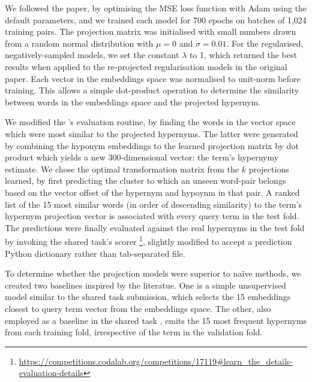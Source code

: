 We followed the paper, by optimising the MSE loss function with Adam \citep{kingma2014adam} using the default parameters, and we trained each model for 700 epochs on batches of 1,024 training pairs. The projection matrix was initialised with small numbers drawn from a random normal distribution with $\mu=0$ and $\sigma=0.01$.  For the regularised, negatively-sampled models, we set the constant $\lambda$ to 1, which returned the best results when applied to the re-projected regularisation models in the original paper.  Each vector in the embeddings space was normalised to unit-norm before training.  This allows a simple dot-product operation to determine the similarity between words in the embeddings space and the projected hypernym.

We modified the \citeauthor{ustalov2017negative}'s evaluation routine, by finding the words in the vector space which were most similar to the projected hypernyms.  The latter were generated by combining the hyponym embeddings to the learned projection matrix by dot product which yields a new 300-dimensional vector: the term's hypernymy estimate.  We chose the optimal transformation matrix from the $k$ projections learned, by first predicting the cluster to which an unseen word-pair belongs based on the vector offset of the hypernym and hypoynm in that pair.  A ranked list of the 15 most similar words (in order of descending similarity) to the term's hypernym projection vector is associated with every query term in the test fold.  The predictions were finally evaluated against the real hypernyms in the test fold by invoking the shared task's scorer \footnote{\url{https://competitions.codalab.org/competitions/17119\#learn_the_details-evaluation-details}}, slightly modified to accept a prediction Python dictionary rather than tab-separated file.  

To determine whether the projection models were superior to na\"ive methods, we created two baselines inspired by the literatue.  One is a simple unsupervised model similar to the \cite{maldonado2018adapt} shared task submission, which selects the 15 embeddings closest to query term vector from the embeddings space.  The other, also employed as a baseline in the shared task \citep{camacho2018semeval}, emits the 15 most frequent hypernyms from each training fold, irrespective of the term in the validation fold.  

